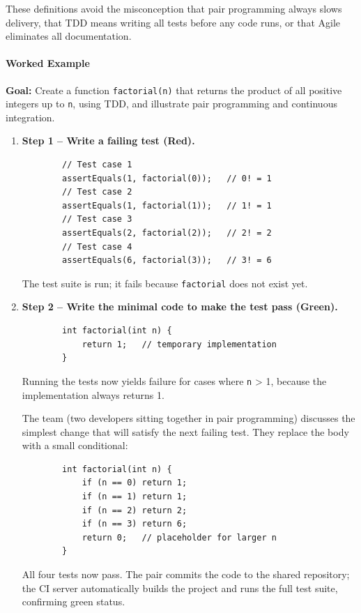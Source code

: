 \documentclass[12pt, a4paper]{article}
\begin{document}
These definitions avoid the misconception that pair programming always slows delivery, that TDD means writing all tests before any code runs, or that Agile eliminates all documentation.

\paragraph{Worked Example}
\textbf{Goal:} Create a function \verb|factorial(n)| that returns the product of all positive integers up to \verb|n|, using TDD, and illustrate pair programming and continuous integration.

\begin{enumerate}
  \item \textbf{Step 1 -- Write a failing test (Red).}
        \begin{verbatim}
        // Test case 1
        assertEquals(1, factorial(0));   // 0! = 1
        // Test case 2
        assertEquals(1, factorial(1));   // 1! = 1
        // Test case 3
        assertEquals(2, factorial(2));   // 2! = 2
        // Test case 4
        assertEquals(6, factorial(3));   // 3! = 6
        \end{verbatim}
        The test suite is run; it fails because \verb|factorial| does not exist yet.

  \item \textbf{Step 2 -- Write the minimal code to make the test pass (Green).}
        \begin{verbatim}
        int factorial(int n) {
            return 1;   // temporary implementation
        }
        \end{verbatim}
        Running the tests now yields failure for cases where \verb|n| > 1, because the implementation always returns 1.

        The team (two developers sitting together in pair programming) discusses the simplest change that will satisfy the next failing test. They replace the body with a small conditional:
        \begin{verbatim}
        int factorial(int n) {
            if (n == 0) return 1;
            if (n == 1) return 1;
            if (n == 2) return 2;
            if (n == 3) return 6;
            return 0;   // placeholder for larger n
        }
        \end{verbatim}
        All four tests now pass. The pair commits the code to the shared repository; the CI server automatically builds the project and runs the full test suite, confirming green status.


\end{enumerate}
\end{document}
